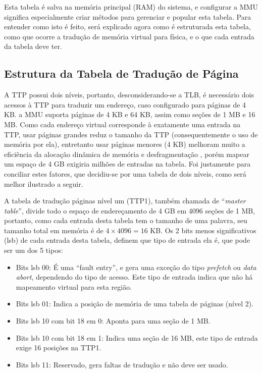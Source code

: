 Esta tabela é salva na memória principal (RAM) do sistema, e configurar a MMU significa especialmente criar métodos para gerenciar e popular esta tabela. Para entender como isto é feito, será explicado agora como é estruturada esta tabela, como que ocorre a tradução de memória virtual para física, e o que cada entrada da tabela deve ter.

\subsection{Estrutura da Tabela de Tradução de Página}

A TTP possui dois níveis, portanto, desconsiderando-se a TLB, é necessário dois acessos à TTP para traduzir um endereço, caso configurado para páginas de 4 KB. a MMU suporta páginas de 4 KB e 64 KB, assim como seções de 1 MB e 16 MB. Como cada endereço virtual corresponde à exatamente uma entrada na TTP, usar páginas grandes reduz o tamanho da TTP (consequentemente o uso de memória por ela), entretanto usar páginas menores (4 KB) melhoram muito a eficiência da alocação dinâmica de memória e desfragmentação \cite[p.~77]{ug585.1.7}, porém mapear um espaço de 4 GB exigiria milhões de entradas na tabela. Foi justamente para conciliar estes fatores, que decidiu-se por uma tabela de dois níveis, como será melhor ilustrado a seguir.

A tabela de tradução páginas nível um (TTP1), também chamada de ``\emph{master table}'', divide todo o espaço de endereçamento de 4 GB em 4096 seções de 1 MB, portanto, como cada entrada desta tabela tem o tamanho de uma palavra, seu tamanho total em memória é de $4 \times 4096 = 16$ KB. Os 2 bits menos significativos (lsb) de cada entrada desta tabela, definem que tipo de entrada ela é, que pode ser um dos 5 tipos:

\begin{itemize}
	\item Bits lsb 00: É uma ``fault entry'', e gera uma exceção do tipo \emph{prefetch} ou \emph{data abort}, dependendo do tipo de acesso. Este tipo de entrada indica que não há mapeamento virtual para esta região.
	\item Bits lsb 01: Indica a posição de memória de uma tabela de páginas (nível 2).
	\item Bits lsb 10 com bit 18 em 0: Aponta para uma seção de 1 MB.
	\item Bits lsb 10 com bit 18 em 1: Indica uma seção de 16 MB, este tipo de entrada exige 16 posições na TTP1.
	\item Bits lsb 11: Reservado, gera faltas de tradução e não deve ser usado.
\end{itemize}

